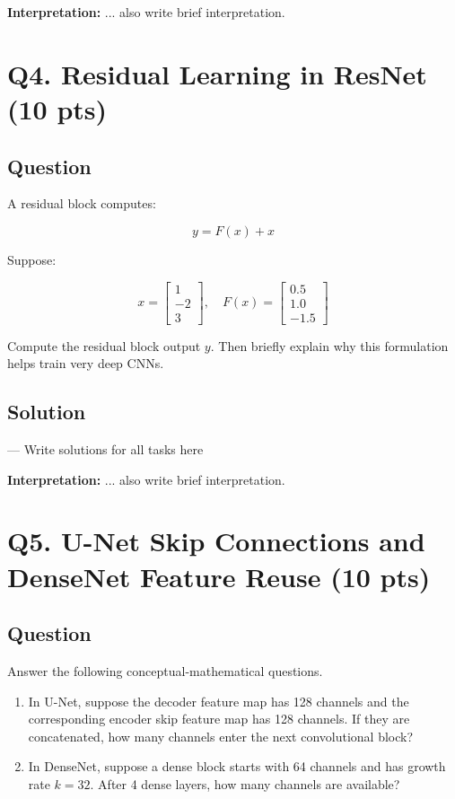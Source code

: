 \documentclass[11pt]{article}
\begin{document}
\noindent \textbf{Interpretation:} ... also write brief interpretation.

\section*{Q4. Residual Learning in ResNet (10 pts)}

\subsection*{Question}

A residual block computes:

\[
y=F(x)+x
\]

Suppose:

\[
x=
\begin{bmatrix}
1\\
-2\\
3
\end{bmatrix},
\quad
F(x)=
\begin{bmatrix}
0.5\\
1.0\\
-1.5
\end{bmatrix}
\]

Compute the residual block output \(y\). Then briefly explain why this formulation helps train very deep CNNs.

\subsection*{Solution}

--- Write solutions for all tasks here 

\noindent \textbf{Interpretation:} ... also write brief interpretation.

\section*{Q5. U-Net Skip Connections and DenseNet Feature Reuse (10 pts)}

\subsection*{Question}

Answer the following conceptual-mathematical questions.

\begin{enumerate}
    \item In U-Net, suppose the decoder feature map has 128 channels and the corresponding encoder skip feature map has 128 channels. If they are concatenated, how many channels enter the next convolutional block?
    \item In DenseNet, suppose a dense block starts with 64 channels and has growth rate \(k=32\). After 4 dense layers, how many channels are available?
\end{enumerate}
\end{document}

